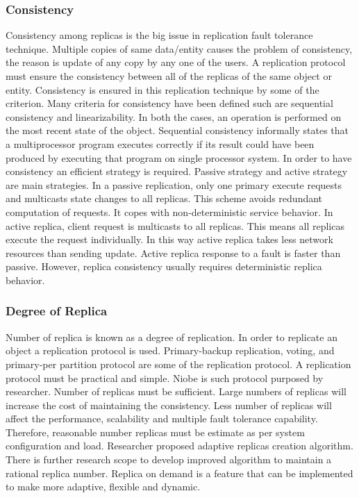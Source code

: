 \documentclass{article}
\begin{document}
\subsubsection{Consistency}
Consistency among replicas is the big issue in replication fault tolerance technique. Multiple copies of same data/entity causes the problem of consistency, the reason is update of any copy by any one of the users. A replication protocol must ensure the consistency between all of the replicas of the same object or entity. Consistency is ensured in this replication technique by some of the criterion. Many criteria for consistency have been defined such are sequential consistency and linearizability. In both the cases, an operation is performed on the most recent state of the object. Sequential consistency informally states that a multiprocessor program executes correctly if its result could have been produced by executing that program on single processor system. In order to have consistency an efficient strategy is required. Passive strategy and active strategy are main strategies. In a passive replication, only one primary execute requests and multicasts state changes to all replicas. This scheme avoids redundant computation of requests. It copes with non-deterministic service behavior. In active replica, client request is multicasts to all replicas. This means all replicas execute the request individually. In this way active replica takes less network resources than sending update. Active replica response to a fault is faster than passive. However, replica consistency usually requires deterministic replica behavior.

\subsubsection{Degree of Replica}
Number of replica is known as a degree of replication. In order to replicate an object a replication protocol is used. Primary-backup replication, voting, and primary-per partition protocol are some of the replication protocol. A replication protocol must be practical and simple. Niobe is such protocol purposed by researcher. Number of replicas must be sufficient. Large numbers of replicas will increase the cost of maintaining the consistency. Less number of replicas will affect the performance, scalability and multiple fault tolerance capability. Therefore, reasonable number replicas must be estimate as per system configuration and load. Researcher proposed adaptive replicas creation algorithm. There is further research scope to develop improved algorithm to maintain a rational replica number. Replica on demand is a feature that can be implemented to make more adaptive, flexible and dynamic.
\end{document}
